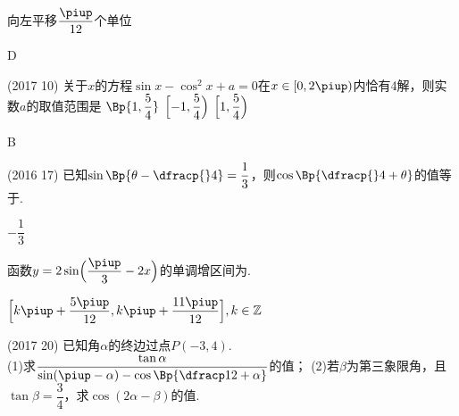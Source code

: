 \begin{exercise}
       {向左平移$\dfrac{\piup}{12}$个单位}
      \begin{answer}
        D
      \end{answer}
    \item%
      (2017  10)
      关于$x$的方程$\sin x-\cos^2x+a=0$在$x\in[0,2\piup)$内恰有4解，则实数$a$的取值范围是\xz
       {$\Bp{1,\dfrac54}$}
       {$\Bigl[-1,\dfrac54\Bigr)$}
       {$\Bigl[1,\dfrac54\Bigr)$}
      \begin{answer}
        B
      \end{answer}
    \item%
      (2016  17)
      已知$\sin\Bp{\theta-\dfracp{}4}=\dfrac13$，则$\cos\Bp{\dfracp{}4+\theta}$的值等于\tk.
      \begin{answer}
        $-\dfrac13$
      \end{answer}
    \item%
      函数$y=2\sin\Bigl(\dfrac{\piup}3-2x \Bigr)$的单调增区间为\tk.
      \begin{answer}
        $\Bigl[k\piup+\dfrac{5\piup}{12},k\piup+\dfrac{11\piup}{12} \Bigr],k\in\mathbb{Z}$
      \end{answer}
    \item%
      (2017  20)
      已知角$\alpha$的终边过点$P(-3,4)$.\\
      (1)求$\dfrac{\tan\alpha}{\sin(\piup-\alpha)-\cos\Bp{\dfracp12+\alpha}}$的值；\quad
      (2)若$\beta$为第三象限角，且$\tan\beta=\dfrac34$，求$\cos(2\alpha-\beta)$的值.

\end{exercise}
